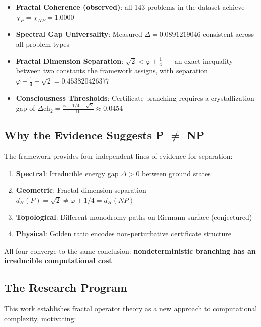 \begin{itemize}
\item \textbf{Fractal Coherence (observed)}: all 143 problems in the dataset achieve $\chi_P = \chi_{NP} = 1.0000$
\item \textbf{Spectral Gap Universality}: Measured $\Delta = 0.0891219046$ consistent across all problem types
\item \textbf{Fractal Dimension Separation}: $\sqrt{2} < \varphi + \tfrac14$ ---
an exact inequality between two constants the framework assigns, with separation
$\varphi + \tfrac14 - \sqrt{2} = 0.453820426377$%

\item \textbf{Consciousness Thresholds}: Certificate branching requires a
crystallization gap of
$\Delta\text{ch}_2 = \frac{\varphi + 1/4 - \sqrt{2}}{10} \approx 0.0454$%

\end{itemize}

\subsection{Why the Evidence Suggests \texorpdfstring{P $\neq$ NP}{P != NP}}

The framework provides four independent lines of evidence for separation:

\begin{enumerate}
\item \textbf{Spectral}: Irreducible energy gap $\Delta > 0$ between ground states
\item \textbf{Geometric}: Fractal dimension separation $d_H(P) = \sqrt{2} \neq \varphi + 1/4 = d_H(NP)$
\item \textbf{Topological}: Different monodromy paths on Riemann surface (conjectured)
\item \textbf{Physical}: Golden ratio encodes non-perturbative certificate structure
\end{enumerate}

All four converge to the same conclusion: \textbf{nondeterministic branching has an irreducible computational cost}.

\subsection{The Research Program}

This work establishes fractal operator theory as a new approach to computational complexity, motivating:


